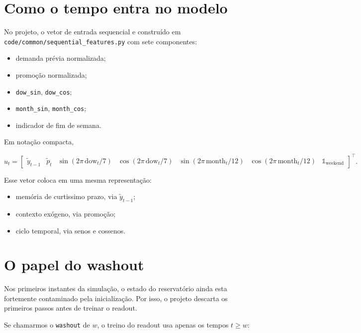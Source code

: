 \documentclass[12pt]{article}
\providecommand{\tightlist}{%
              \setlength{\itemsep}{0pt}\setlength{\parskip}{0pt}}
\begin{document}
\section{Como o tempo entra no modelo}\label{5-como-o-tempo-entra-no-modelo}

No projeto, o vetor de entrada sequencial e construído em \texttt{code/common/sequential\_features.py} com sete componentes:

\begin{itemize}
\tightlist
\item
  demanda prévia normalizada;
\item
  promoção normalizada;
\item
  \texttt{dow\_sin}, \texttt{dow\_cos};
\item
  \texttt{month\_sin}, \texttt{month\_cos};
\item
  indicador de fim de semana.
\end{itemize}

Em notação compacta,

\[
u_t =
\begin{bmatrix}
\widetilde{y}_{t-1} &
\widetilde{p}_t &
\sin(2\pi \, \mathrm{dow}_t / 7) &
\cos(2\pi \, \mathrm{dow}_t / 7) &
\sin(2\pi \, \mathrm{month}_t / 12) &
\cos(2\pi \, \mathrm{month}_t / 12) &
\mathbb{1}_{\mathrm{weekend}}
\end{bmatrix}^\top.
\]

Esse vetor coloca em uma mesma representação:

\begin{itemize}
\tightlist
\item
  memória de curtissimo prazo, via \(\widetilde{y}_{t-1}\);
\item
  contexto exógeno, via promoção;
\item
  ciclo temporal, via senos e cossenos.
\end{itemize}

\section{O papel do washout}\label{6-o-papel-do-washout}

Nos primeiros instantes da simulação, o estado do reservatório ainda esta fortemente contaminado pela inicialização. Por isso, o projeto descarta os primeiros passos antes de treinar o readout.

Se chamarmos o \texttt{washout} de \(w\), o treino do readout usa apenas os tempos \(t \ge w\):
\end{document}
